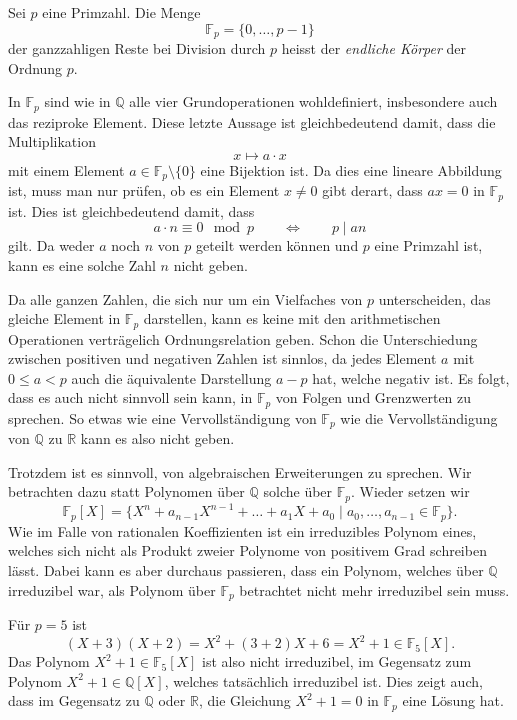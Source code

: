 \begin{definition}
%
%
Sei $p$ eine Primzahl.
Die Menge
\[
\mathbb{F}_p
=
\{ 0, \dots , p-1 \}
\]
der ganzzahligen Reste bei Division durch $p$
heisst der \emph{endliche Körper} der Ordnung $p$.
%
%
%
\end{definition}

In $\mathbb{F}_p$ sind wie in $\mathbb{Q}$ alle vier Grundoperationen
wohldefiniert, insbesondere auch das reziproke Element.
Diese letzte Aussage ist gleichbedeutend damit, dass die Multiplikation
\[
x\mapsto a\cdot x
\]
mit einem Element $a\in\mathbb{F}_p\setminus\{0\}$ eine Bijektion ist.
Da dies eine lineare Abbildung ist, muss man nur prüfen, ob es ein
Element $x\ne 0$ gibt derart, dass $ax=0$ in $\mathbb{F}_p$ ist.
Dies ist gleichbedeutend damit, dass 
\[
a\cdot n \equiv 0 \mod p
\qquad\Leftrightarrow\qquad
p \mid an
\]
gilt.
Da weder $a$ noch $n$ von $p$ geteilt werden können und $p$ eine
Primzahl ist, kann es eine solche Zahl $n$ nicht geben.

Da alle ganzen Zahlen, die sich nur um ein Vielfaches von $p$
unterscheiden, das gleiche Element in $\mathbb{F}_p$ darstellen,
kann es keine mit den arithmetischen Operationen verträgelich
Ordnungsrelation geben.
Schon die Unterschiedung zwischen positiven und negativen
Zahlen ist sinnlos, da jedes Element $a$ mit $0\le a<p$ auch
die äquivalente Darstellung $a-p$ hat, welche negativ ist.
Es folgt, dass es auch nicht sinnvoll sein kann, in $\mathbb{F}_p$
von Folgen und Grenzwerten zu sprechen.
So etwas wie eine Vervollständigung von $\mathbb{F}_p$ wie
die Vervollständigung von $\mathbb{Q}$ zu $\mathbb{R}$ kann es
also nicht geben.

Trotzdem ist es sinnvoll, von algebraischen Erweiterungen zu sprechen.
Wir betrachten dazu statt Polynomen über $\mathbb{Q}$ solche über
$\mathbb{F}_p$.
Wieder setzen wir
\[
\mathbb{F}_p[X]
=
\{
X^n + a_{n-1}X^{n-1} + \dots + a_1X + a_0
\mid
a_0,\dots,a_{n-1}\in \mathbb{F}_p
\}.
\]
Wie im Falle von rationalen Koeffizienten ist ein irreduzibles
Polynom eines, welches sich nicht als Produkt zweier Polynome von
positivem Grad schreiben lässt.
Dabei kann es aber durchaus passieren, dass ein Polynom, welches
über $\mathbb{Q}$ irreduzibel war, als Polynom über $\mathbb{F}_p$
betrachtet nicht mehr irreduzibel sein muss.

\begin{beispiel}
Für $p=5$ ist
\[
(X+3)(X+2)
=
X^2 + (3+2)X + 6
=
X^2 + 1
\in
\mathbb{F}_5[X].
\]
Das Polynom $X^2+1\in\mathbb{F}_5[X]$ ist also nicht irreduzibel,
im Gegensatz zum Polynom $X^2+1\in\mathbb{Q}[X]$, welches tatsächlich
irreduzibel ist.
Dies zeigt auch, dass im Gegensatz zu $\mathbb{Q}$ oder $\mathbb{R}$,
die Gleichung $X^2+1=0$ in $\mathbb{F}_p$ eine Lösung hat.
\end{beispiel}

